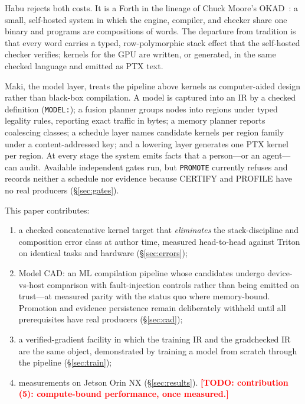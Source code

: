 \documentclass[11pt]{article}
\newcommand{\todo}[1]{\textcolor{red}{\textbf{[TODO: #1]}}}
\newcommand{\code}[1]{\texttt{#1}}
\begin{document}
Habu rejects both costs. It is a Forth in the lineage of Chuck Moore's
OKAD~\cite{okad}: a small, self-hosted system in which the engine, compiler,
and checker share one binary and programs are
compositions of words. The departure from tradition is that every word
carries a typed, row-polymorphic stack effect that the self-hosted checker
verifies; kernels for the GPU are written, or generated, in the same
checked language and emitted as PTX text.

Maki, the model layer, treats the pipeline above kernels as
computer-aided design rather than black-box compilation. A model is
captured into an IR by a checked definition (\code{MODEL:}); a fusion
planner groups nodes into regions under typed legality rules, reporting
exact traffic in bytes; a memory planner reports coalescing classes; a
schedule layer names candidate kernels per region family under a
content-addressed key; and a lowering layer generates one PTX kernel per
region. At every stage the system emits facts that a person---or an
agent---can audit. Available independent gates run, but \code{PROMOTE}
currently refuses and records neither a schedule nor evidence because
CERTIFY and PROFILE have no real producers (\S\ref{sec:gates}).

This paper contributes:
\begin{enumerate}
\item a checked concatenative kernel target that \emph{eliminates} the
  stack-discipline and composition error class at author time, measured
  head-to-head against Triton on identical tasks and hardware
  (\S\ref{sec:errors});
\item Model CAD: an ML compilation pipeline whose candidates undergo
  device-vs-host comparison with fault-injection controls rather than being
  emitted on trust---at measured parity with the status quo where
  memory-bound. Promotion and evidence persistence remain deliberately
  withheld until all prerequisites have real producers
  (\S\ref{sec:cad});
\item a verified-gradient facility in which the training IR and the
  gradchecked IR are the same object, demonstrated by training a model
  from scratch through the pipeline (\S\ref{sec:train});
\item measurements on Jetson Orin NX (\S\ref{sec:results}).
  \todo{contribution (5): compute-bound performance, once measured.}
\end{enumerate}
\end{document}
